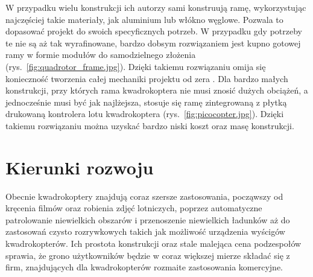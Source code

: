 W przypadku wielu konstrukcji ich autorzy sami konstruują ramę, wykorzystując najczęściej takie materiały, jak aluminium lub włókno węglowe. Pozwala to dopasować projekt do swoich specyficznych potrzeb. W przypadku gdy potrzeby te nie są aż tak wyrafinowane, bardzo dobsym rozwiązaniem jest kupno gotowej ramy w formie modułów do samodzielnego złożenia (rys.~\ref{fig:quadrotor_frame.jpg}). Dzięki takiemu rozwiązaniu omija się konieczność tworzenia całej mechaniki projektu od zera . Dla bardzo małych konstrukcji, przy których rama kwadrokoptera nie musi znosić dużych obciążeń, a jednocześnie musi być jak najlżejsza, stosuje się ramę zintegrowaną z płytką drukowaną kontrolera lotu kwadrokoptera (rys.~\ref{fig:picocopter.jpg}). Dzięki takiemu rozwiązaniu można uzyskać bardzo niski koszt oraz masę konstrukcji. 


\section{Kierunki rozwoju}

Obecnie kwadrokoptery znajdują coraz szersze zastosowania, począwszy od kręcenia filmów oraz robienia zdjęć lotniczych, poprzez automatyczne patrolowanie niewielkich obszarów i przenoszenie niewielkich ładunków aż do zastosowań czysto rozrywkowych takich jak możliwość urządzenia wyścigów kwadrokopterów. Ich prostota konstrukcji oraz stale malejąca cena podzespołów sprawia, że grono użytkowników będzie w coraz większej mierze składać się z firm, znajdujących dla kwadrokopterów rozmaite zastosowania komercyjne. 

